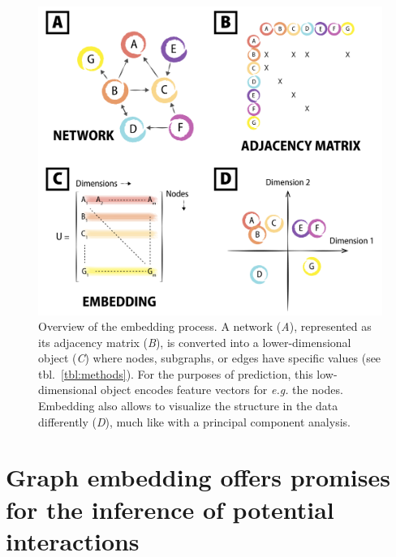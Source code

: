 \documentclass[11pt]{article}
\makeatletter
\def\maxwidth{\ifdim\Gin@nat@width>\linewidth\linewidth
\else\Gin@nat@width\fi}
\let\Oldincludegraphics\includegraphics
\renewcommand{\includegraphics}[1]{\Oldincludegraphics[width=\maxwidth]{#1}}
\makeatother
\begin{document}
\begin{figure}
\hypertarget{fig:embedding}{%
\centering
\includegraphics{figures/conceptual_embedding.png}
\caption{Overview of the embedding process. A network (\emph{A}),
represented as its adjacency matrix (\emph{B}), is converted into a
lower-dimensional object (\emph{C}) where nodes, subgraphs, or edges
have specific values (see tbl.~\ref{tbl:methods}). For the purposes of
prediction, this low-dimensional object encodes feature vectors for
\emph{e.g.} the nodes. Embedding also allows to visualize the structure
in the data differently (\emph{D}), much like with a principal component
analysis.}\label{fig:embedding}
}
\end{figure}

\hypertarget{graph-embedding-offers-promises-for-the-inference-of-potential-interactions}{%
\section{Graph embedding offers promises for the inference of potential
interactions}\label{graph-embedding-offers-promises-for-the-inference-of-potential-interactions}}
\end{document}

